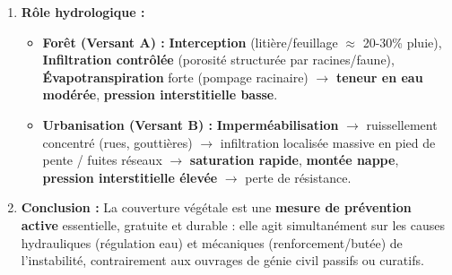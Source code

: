 \documentclass[11pt]{article}
\begin{document}
\begin{exercice}
\begin{enumerate}
\begin{itemize}
      \item \textbf{Effet de butée :} Les souches et gros bois agissent comme des \textbf{butées} passives qui s'opposent au mouvement des masses superficielles par leur enfoncement dans le substratum stable.
      \end{itemize}
\item \textbf{Rôle hydrologique :}
      \begin{itemize}
      \item \textbf{Forêt (Versant A) :} \textbf{Interception} (litière/feuillage $\approx$ 20-30\% pluie), \textbf{Infiltration contrôlée} (porosité structurée par racines/faune), \textbf{Évapotranspiration} forte (pompage racinaire) $\rightarrow$ \textbf{teneur en eau modérée}, \textbf{pression interstitielle basse}.
      \item \textbf{Urbanisation (Versant B) :} \textbf{Imperméabilisation} $\rightarrow$ ruissellement concentré (rues, gouttières) $\rightarrow$ infiltration localisée massive en pied de pente / fuites réseaux $\rightarrow$ \textbf{saturation rapide}, \textbf{montée nappe}, \textbf{pression interstitielle élevée} $\rightarrow$ perte de résistance.
      \end{itemize}
\item \textbf{Conclusion :} La couverture végétale est une \textbf{mesure de prévention active} essentielle, gratuite et durable : elle agit simultanément sur les causes hydrauliques (régulation eau) et mécaniques (renforcement/butée) de l'instabilité, contrairement aux ouvrages de génie civil passifs ou curatifs.
\end{enumerate}
\end{exercice}
\end{document}
